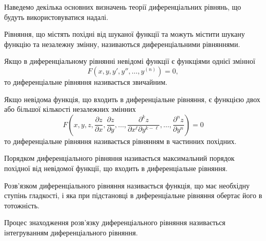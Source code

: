 Наведемо декілька основних визначень теорії диференціальних рівнянь, що будуть використовуватися надалі.

\begin{definition}
	Рівняння, що містять похідні від шуканої функції та можуть містити шукану функцію та незалежну змінну, називаються диференціальними рівняннями.
\end{definition}

\begin{definition}
	Якщо в диференціальному рівнянні невідомі функції є функціями однієї змінної
	\begin{equation*}
		F \left( x, y, y', y'', \ldots, y^{(n)} \right) = 0,
	\end{equation*}
	то диференціальне рівняння називається звичайним.
\end{definition}

\begin{definition}
	Якщо невідома функція, що входить в диференціальне рівняння, є функцією двох або більшої кількості незалежних змінних
	\begin{equation*}
		F \left( x, y, z, \frac{\partial z}{\partial x}, \frac{\partial z}{\partial y}, \ldots, \frac{\partial^k z}{\partial x^\ell \partial y^{k - \ell}}, \ldots, \frac{\partial^n z}{\partial y^n} \right) = 0
	\end{equation*}
	то диференціальне рівняння називається рівнянням в частинних похідних.
\end{definition}

\begin{definition}
	Порядком диференціального рівняння називається максимальний порядок похідної від невідомої функції, що входить в диференціальне рівняння.
\end{definition}

\begin{definition}
	Розв’язком диференціального рівняння називається функція, що має необхідну ступінь гладкості, і яка при підстановці в диференціальне рівняння обертає його в тотожність. 
\end{definition}

\begin{definition}
	Процес знаходження розв’язку диференціального рівняння називається інтегруванням диференціального рівняння.
\end{definition}
